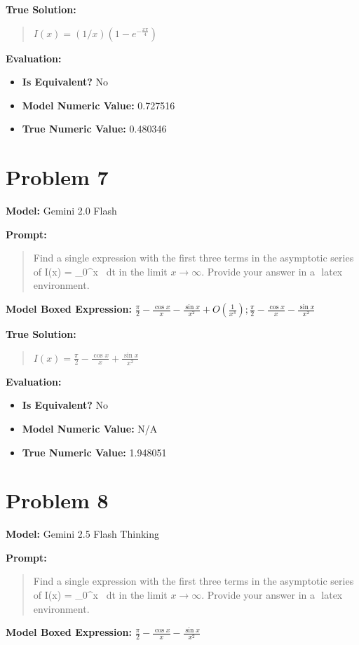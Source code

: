 \documentclass{article}
\begin{document}
\textbf{True Solution:}
\begin{quote}
$I(x)=(1/x)(1-e^{-\frac{x \pi}{4}})$
\end{quote}

\textbf{Evaluation:}
\begin{itemize}
\item \textbf{Is Equivalent?} No
\item \textbf{Model Numeric Value:} 0.727516
\item \textbf{True Numeric Value:} 0.480346
\end{itemize}
\vspace{1cm}
\section*{Problem 7}
\textbf{Model:} Gemini 2.0 Flash

\textbf{Prompt:}
\begin{quote}
Find a single expression with the first three terms in the asymptotic series of I(x) = \int\limits_{0}^{x}  \ dt in the limit $x \to \infty$. Provide your answer in a $\boxed{}$ latex environment.
\end{quote}
\textbf{Model Boxed Expression:} $\frac{\pi}{2} - \frac{\cos x}{x} - \frac{\sin x}{x^2} + O\left(\frac{1}{x^3}\right); \frac{\pi}{2} - \frac{\cos x}{x} - \frac{\sin x}{x^2}$

\textbf{True Solution:}
\begin{quote}
$I(x)=\frac{\pi}{2} - \frac{\cos x}{x} + \frac{\sin x}{x^2}$
\end{quote}

\textbf{Evaluation:}
\begin{itemize}
\item \textbf{Is Equivalent?} No
\item \textbf{Model Numeric Value:} N/A
\item \textbf{True Numeric Value:} 1.948051
\end{itemize}
\vspace{1cm}
\section*{Problem 8}
\textbf{Model:} Gemini 2.5 Flash Thinking

\textbf{Prompt:}
\begin{quote}
Find a single expression with the first three terms in the asymptotic series of I(x) = \int\limits_{0}^{x}  \ dt in the limit $x \to \infty$. Provide your answer in a $\boxed{}$ latex environment.
\end{quote}
\textbf{Model Boxed Expression:} $\frac{\pi}{2} - \frac{\cos x}{x} - \frac{\sin x}{x^2}$
\end{document}
